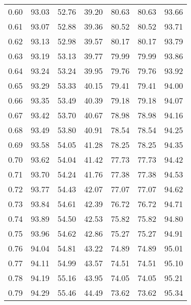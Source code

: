 \begin{tabular}{|c|c|c|c|c|c|c|}
      0.60 &     93.03 &     52.76 &      39.20 &   80.63 &      80.63 &         93.66 \\
      0.61 &     93.07 &     52.88 &      39.36 &   80.52 &      80.52 &         93.71 \\
      0.62 &     93.13 &     52.98 &      39.57 &   80.17 &      80.17 &         93.79 \\
      0.63 &     93.19 &     53.13 &      39.77 &   79.99 &      79.99 &         93.86 \\
      0.64 &     93.24 &     53.24 &      39.95 &   79.76 &      79.76 &         93.92 \\
      0.65 &     93.29 &     53.33 &      40.15 &   79.41 &      79.41 &         94.00 \\
      0.66 &     93.35 &     53.49 &      40.39 &   79.18 &      79.18 &         94.07 \\
      0.67 &     93.42 &     53.70 &      40.67 &   78.98 &      78.98 &         94.16 \\
      0.68 &     93.49 &     53.80 &      40.91 &   78.54 &      78.54 &         94.25 \\
      0.69 &     93.58 &     54.05 &      41.28 &   78.25 &      78.25 &         94.35 \\
      0.70 &     93.62 &     54.04 &      41.42 &   77.73 &      77.73 &         94.42 \\
      0.71 &     93.70 &     54.24 &      41.76 &   77.38 &      77.38 &         94.53 \\
      0.72 &     93.77 &     54.43 &      42.07 &   77.07 &      77.07 &         94.62 \\
      0.73 &     93.84 &     54.61 &      42.39 &   76.72 &      76.72 &         94.71 \\
      0.74 &     93.89 &     54.50 &      42.53 &   75.82 &      75.82 &         94.80 \\
      0.75 &     93.96 &     54.62 &      42.86 &   75.27 &      75.27 &         94.91 \\
      0.76 &     94.04 &     54.81 &      43.22 &   74.89 &      74.89 &         95.01 \\
      0.77 &     94.11 &     54.99 &      43.57 &   74.51 &      74.51 &         95.10 \\
      0.78 &     94.19 &     55.16 &      43.95 &   74.05 &      74.05 &         95.21 \\
      0.79 &     94.29 &     55.46 &      44.49 &   73.62 &      73.62 &         95.34 \\

\end{tabular}
